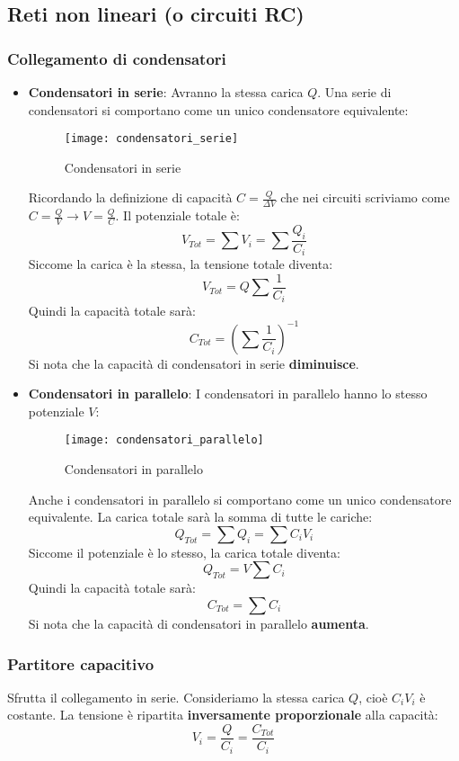 \documentclass[a4paper]{article}
\begin{document}
\subsection{Reti non lineari (o circuiti RC)}
\subsubsection{Collegamento di condensatori}
\begin{itemize}
  \item \textbf{Condensatori in serie}: Avranno la stessa carica \( Q \).
    Una serie di condensatori si comportano come un unico condensatore equivalente:
    \begin{figure}[H]
      \centering
      \texttt{[image: condensatori\_serie]}
      \caption{Condensatori in serie}
    \end{figure}
    \noindent
    Ricordando la definizione di capacità \( C = \frac{Q}{\Delta V} \) che nei circuiti
    scriviamo come \( C = \frac{Q}{V} \to V = \frac{Q}{C} \). Il potenziale totale è:
    \[
      V_{Tot} = \sum V_i =  \sum \frac{Q_i}{C_i}
    \] 
    Siccome la carica è la stessa, la tensione totale diventa:
    \[
      V_{Tot} = Q \sum \frac{1}{C_i}
    \] 
    Quindi la capacità totale sarà:
    \[
      C_{Tot} = \left( \sum \frac{1}{C_i} \right)^{-1}
    \] 
    Si nota che la capacità di condensatori in serie \textbf{diminuisce}.

  \item \textbf{Condensatori in parallelo}: I condensatori in parallelo hanno lo stesso
    potenziale \( V \):
    \begin{figure}[H]
      \centering
      \texttt{[image: condensatori\_parallelo]}
      \caption{Condensatori in parallelo}
    \end{figure}
    \noindent
    Anche i condensatori in parallelo si comportano come un unico condensatore equivalente.
    La carica totale sarà la somma di tutte le cariche:
    \[
      Q_{Tot} = \sum Q_i = \sum C_i V_i
    \] 
    Siccome il potenziale è lo stesso, la carica totale diventa:
    \[
      Q_{Tot} = V \sum C_i
    \]
    Quindi la capacità totale sarà:
    \[
      C_{Tot} = \sum C_i
    \]
    Si nota che la capacità di condensatori in parallelo \textbf{aumenta}.
\end{itemize}

\subsubsection{Partitore capacitivo}
Sfrutta il collegamento in serie. Consideriamo
la stessa carica \( Q \), cioè \( C_i V_i \) è costante. La tensione è ripartita
\textbf{inversamente proporzionale} alla capacità:
\[
  V_i = \frac{Q}{C_i} = \frac{C_{Tot}}{C_i}
\] 
\end{document}
